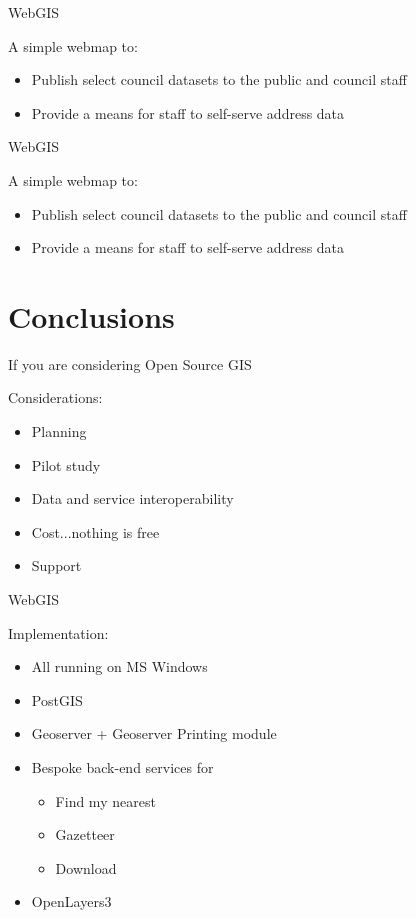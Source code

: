 \begin{frame}{WebGIS}
	\begin{block}{A simple webmap to:}
		\begin{itemize}
			\item Publish select council datasets to the public and council staff
			\item Provide a means for staff to self-serve address data 
		\end{itemize}
	\end{block}	
\end{frame}


\begin{frame}{WebGIS}
	\begin{block}{A simple webmap to:}
		\begin{itemize}
			\item Publish select council datasets to the public and council staff
			\item Provide a means for staff to self-serve address data 
		\end{itemize}
	\end{block}	
\end{frame}

\section{Conclusions}
\begin{frame}{If you are considering Open Source GIS}
	\begin{block}{Considerations:}
		\begin{itemize}
			\item Planning
			\item Pilot study
			\item Data and service interoperability
			\item Cost...nothing is free
			\item Support
		\end{itemize}
	\end{block}	
\end{frame}

\begin{frame}{WebGIS}
	\begin{block}{Implementation:}
		\begin{itemize}
			\item All running on MS Windows
			\item PostGIS
			\item Geoserver + Geoserver Printing module
			\item Bespoke back-end services for
			\begin{itemize}
				\item Find my nearest
				\item Gazetteer
				\item Download
			\end{itemize}
			\item OpenLayers3
		\end{itemize}
	\end{block}	
\end{frame}





